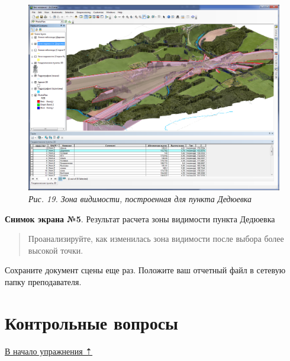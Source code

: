 \documentclass[]{book}
\theoremstyle{definition}
\theoremstyle{definition}
\theoremstyle{definition}
\theoremstyle{remark}
\begin{document}
\begin{enumerate}
  \begin{figure}
  \centering
  \includegraphics{images/Ex18/image21.png}
  \caption{\emph{Рис. 19. Зона видимости, построенная для пункта
  Дедюевка}}
  \end{figure}

  \textbf{Снимок экрана №5}. Результат расчета зоны видимости пункта
  Дедюевка

  \begin{quote}
  Проанализируйте, как изменилась зона видимости после выбора более
  высокой точки.
  \end{quote}
\end{enumerate}

Сохраните документ сцены еще раз. Положите ваш отчетный файл в сетевую
папку преподавателя.

\hypertarget{threed-modelling-questions}{%
\section{Контрольные вопросы}\label{threed-modelling-questions}}

\protect\hyperlink{three-modelling}{В начало упражнения ⇡}
\end{document}

